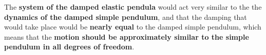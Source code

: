 
{The \textbf{system of the damped elastic pendula} would act very similar to the the \textbf{dynamics of the damped simple pendulum}, and that the damping that would take place would be \textbf{nearly equal} to the damped simple pendulum, which means that the \textbf{motion should be approximately similar to the simple pendulum in all degrees of freedom}.}


